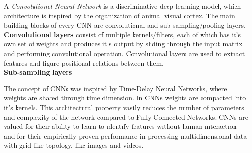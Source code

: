 \begin{definition}
  A \textit{Convolutional Neural Network} \autocite{oshea2015introductionconvolutionalneuralnetworks} \autocite{jmse9040397} \autocite{LIU201711} is a discriminative deep learning model, which architecture is inspired by the organization of animal visual cortex. The main building blocks of every CNN are convolutional and sub-sampling/pooling layers. \\
  \textbf{Convolutional layers} consist of multiple kernels/filters, each of which has it's own set of weights and produces it's output by sliding through the input matrix and performing convolutional operation. Convolutional layers are used to extract features and figure positional relations between them. \\
  \textbf{Sub-sampling layers}
\end{definition}

The concept of CNNs was inspired by Time-Delay Neural Networks, where weights are shared through time dimension. In CNNs weights are compacted into it's kernels. This architectural property vastly reduces the number of parameters and complexity of the network compared to Fully Connected Networks. CNNs are valued for their ability to learn to identify features without human interaction and for their empirically proven performance in processing multidimensional data with grid-like topology, like images and videos.